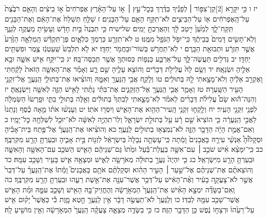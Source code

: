 \documentclass[twoside, openany, parskip=half, 11pt]{book}
\begin{document}
יז ו כִּ֣י יִקָּרֵ֣א ‏[2]קַן־צִפּ֣וֹר ׀ לְפָנֶ֡יךָ בַּדֶּ֜רֶךְ בְּכׇל־עֵ֣ץ ׀ א֣וֹ עַל־הָאָ֗רֶץ אֶפְרֹחִים֙ א֣וֹ בֵיצִ֔ים וְהָאֵ֤ם רֹבֶ֙צֶת֙ עַל־הָֽאֶפְרֹחִ֔ים א֖וֹ עַל־הַבֵּיצִ֑ים לֹא־תִקַּ֥ח הָאֵ֖ם עַל־הַבָּנִֽים׃ ז שַׁלֵּ֤חַ תְּשַׁלַּח֙ אֶת־הָאֵ֔ם וְאֶת־הַבָּנִ֖ים תִּֽקַּֽח־לָ֑ךְ לְמַ֙עַן֙ יִ֣יטַב לָ֔ךְ וְהַאֲרַכְתָּ֖ יָמִֽים׃
שלישיח כִּ֤י תִבְנֶה֙ בַּ֣יִת חָדָ֔שׁ וְעָשִׂ֥יתָ מַעֲקֶ֖ה לְגַגֶּ֑ךָ וְלֹֽא־תָשִׂ֤ים דָּמִים֙ בְּבֵיתֶ֔ךָ כִּֽי־יִפֹּ֥ל הַנֹּפֵ֖ל מִמֶּֽנּוּ׃ ט לֹא־תִזְרַ֥ע כַּרְמְךָ֖ כִּלְאָ֑יִם פֶּן־תִּקְדַּ֗שׁ הַֽמְלֵאָ֤ה הַזֶּ֙רַע֙ אֲשֶׁ֣ר תִּזְרָ֔ע וּתְבוּאַ֖ת הַכָּֽרֶם׃
י לֹֽא־תַחֲרֹ֥שׁ בְּשׁוֹר־וּבַחֲמֹ֖ר יַחְדָּֽו׃ יא לֹ֤א תִלְבַּשׁ֙ שַֽׁעַטְנֵ֔ז צֶ֥מֶר וּפִשְׁתִּ֖ים יַחְדָּֽו׃
יב גְּדִלִ֖ים תַּעֲשֶׂה־לָּ֑ךְ עַל־אַרְבַּ֛ע כַּנְפ֥וֹת כְּסוּתְךָ֖ אֲשֶׁ֥ר תְּכַסֶּה־בָּֽהּ׃
יג כִּֽי־יִקַּ֥ח אִ֖ישׁ אִשָּׁ֑ה וּבָ֥א אֵלֶ֖יהָ וּשְׂנֵאָֽהּ׃ יד וְשָׂ֥ם לָהּ֙ עֲלִילֹ֣ת דְּבָרִ֔ים וְהוֹצִ֥א עָלֶ֖יהָ שֵׁ֣ם רָ֑ע וְאָמַ֗ר אֶת־הָאִשָּׁ֤ה הַזֹּאת֙ לָקַ֔חְתִּי וָאֶקְרַ֣ב אֵלֶ֔יהָ וְלֹא־מָצָ֥אתִי לָ֖הּ בְּתוּלִֽים׃ טו וְלָקַ֛ח אֲבִ֥י הַֽנַּעֲרָ֖ וְאִמָּ֑הּ וְהוֹצִ֜יאוּ אֶת־בְּתוּלֵ֧י הַֽנַּעֲרָ֛ אֶל־זִקְנֵ֥י הָעִ֖יר הַשָּֽׁעְרָה׃ טז וְאָמַ֛ר אֲבִ֥י הַֽנַּעֲרָ֖ אֶל־הַזְּקֵנִ֑ים אֶת־בִּתִּ֗י נָתַ֜תִּי לָאִ֥ישׁ הַזֶּ֛ה לְאִשָּׁ֖ה וַיִּשְׂנָאֶֽהָ׃ יז וְהִנֵּה־ה֡וּא שָׂם֩ עֲלִילֹ֨ת דְּבָרִ֜ים לֵאמֹ֗ר לֹֽא־מָצָ֤אתִי לְבִתְּךָ֙ בְּתוּלִ֔ים וְאֵ֖לֶּה בְּתוּלֵ֣י בִתִּ֑י וּפָֽרְשׂוּ֙ הַשִּׂמְלָ֔ה לִפְנֵ֖י זִקְנֵ֥י הָעִֽיר׃ יח וְלָ֥קְח֛וּ זִקְנֵ֥י הָֽעִיר־הַהִ֖וא אֶת־הָאִ֑ישׁ וְיִסְּר֖וּ אֹתֽוֹ׃ יט וְעָנְשׁ֨וּ אֹת֜וֹ מֵ֣אָה כֶ֗סֶף וְנָתְנוּ֙ לַאֲבִ֣י הַֽנַּעֲרָ֔ה כִּ֤י הוֹצִיא֙ שֵׁ֣ם רָ֔ע עַ֖ל בְּתוּלַ֣ת יִשְׂרָאֵ֑ל וְלֽוֹ־תִהְיֶ֣ה לְאִשָּׁ֔ה לֹא־יוּכַ֥ל לְשַׁלְּחָ֖הּ כׇּל־יָמָֽיו׃
כ וְאִם־אֱמֶ֣ת הָיָ֔ה הַדָּבָ֖ר הַזֶּ֑ה לֹא־נִמְצְא֥וּ בְתוּלִ֖ים לַֽנַּעֲרָֽ׃ כא וְהוֹצִ֨יאוּ אֶת־הַֽנַּעֲרָ֜ אֶל־פֶּ֣תַח בֵּית־אָבִ֗יהָ וּסְקָל֩וּהָ֩ אַנְשֵׁ֨י עִירָ֤הּ בָּאֲבָנִים֙ וָמֵ֔תָה כִּֽי־עָשְׂתָ֤ה נְבָלָה֙ בְּיִשְׂרָאֵ֔ל לִזְנ֖וֹת בֵּ֣ית אָבִ֑יהָ וּבִֽעַרְתָּ֥ הָרָ֖ע מִקִּרְבֶּֽךָ׃
כב כִּֽי־יִמָּצֵ֨א אִ֜ישׁ שֹׁכֵ֣ב ׀ עִם־אִשָּׁ֣ה בְעֻֽלַת־בַּ֗עַל וּמֵ֙תוּ֙ גַּם־שְׁנֵיהֶ֔ם הָאִ֛ישׁ הַשֹּׁכֵ֥ב עִם־הָאִשָּׁ֖ה וְהָאִשָּׁ֑ה וּבִֽעַרְתָּ֥ הָרָ֖ע מִיִּשְׂרָאֵֽל׃
כג כִּ֤י יִהְיֶה֙ נַעֲרָ֣ בְתוּלָ֔ה מְאֹרָשָׂ֖ה לְאִ֑ישׁ וּמְצָאָ֥הּ אִ֛ישׁ בָּעִ֖יר וְשָׁכַ֥ב עִמָּֽהּ׃ כד וְהוֹצֵאתֶ֨ם אֶת־שְׁנֵיהֶ֜ם אֶל־שַׁ֣עַר ׀ הָעִ֣יר הַהִ֗וא וּסְקַלְתֶּ֨ם אֹתָ֥ם בָּאֲבָנִים֮ וָמֵ֒תוּ֒ אֶת־הַֽנַּעֲרָ֗ עַל־דְּבַר֙ אֲשֶׁ֣ר לֹא־צָעֲקָ֣ה בָעִ֔יר וְאֶ֨ת־הָאִ֔ישׁ עַל־דְּבַ֥ר אֲשֶׁר־עִנָּ֖ה אֶת־אֵ֣שֶׁת רֵעֵ֑הוּ וּבִֽעַרְתָּ֥ הָרָ֖ע מִקִּרְבֶּֽךָ׃
כה וְֽאִם־בַּשָּׂדֶ֞ה יִמְצָ֣א הָאִ֗ישׁ אֶת־הַֽנַּעֲרָ֙ הַמְאֹ֣רָשָׂ֔ה וְהֶחֱזִֽיק־בָּ֥הּ הָאִ֖ישׁ וְשָׁכַ֣ב עִמָּ֑הּ וּמֵ֗ת הָאִ֛ישׁ אֲשֶׁר־שָׁכַ֥ב עִמָּ֖הּ לְבַדּֽוֹ׃ כו וְלַֽנַּעֲרָ֙ לֹא־תַעֲשֶׂ֣ה דָבָ֔ר אֵ֥ין לַֽנַּעֲרָ֖ חֵ֣טְא מָ֑וֶת כִּ֡י כַּאֲשֶׁר֩ יָק֨וּם אִ֤ישׁ עַל־רֵעֵ֙הוּ֙ וּרְצָח֣וֹ נֶ֔פֶשׁ כֵּ֖ן הַדָּבָ֥ר הַזֶּֽה׃ כז כִּ֥י בַשָּׂדֶ֖ה מְצָאָ֑הּ צָעֲקָ֗ה הַֽנַּעֲרָ֙ הַמְאֹ֣רָשָׂ֔ה וְאֵ֥ין מוֹשִׁ֖יעַ לָֽהּ׃
\end{document}
